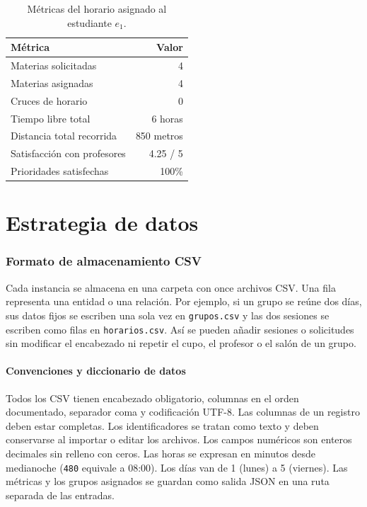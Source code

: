 \documentclass[11pt]{article}
\numberwithin{equation}{section}
\numberwithin{figure}{section}
\numberwithin{table}{section}
\theoremstyle{definition}
\begin{document}
\begin{table}[H]
\centering
\caption{Métricas del horario asignado al estudiante $e_1$.}
\begin{tabular}{lr}
\toprule
\textbf{Métrica} & \textbf{Valor} \\
\midrule
Materias solicitadas        & 4 \\
Materias asignadas          & 4 \\
Cruces de horario           & 0 \\
Tiempo libre total          & 6 horas \\
Distancia total recorrida   & 850 metros \\
Satisfacción con profesores & 4.25 / 5 \\
Prioridades satisfechas     & 100\% \\
\bottomrule
\end{tabular}
\end{table}

\part{Estrategia de datos}

\section{Formato de almacenamiento CSV}
\label{sec:csv}

Cada instancia se almacena en una carpeta con once archivos CSV. Una fila
representa una entidad o una relación. Por ejemplo, si un grupo se reúne
dos días, sus datos fijos se escriben una sola vez en \texttt{grupos.csv}
y las dos sesiones se escriben como filas en \texttt{horarios.csv}.
Así se pueden añadir sesiones o solicitudes sin modificar el encabezado
ni repetir el cupo, el profesor o el salón de un grupo.

\subsection{Convenciones y diccionario de datos}

Todos los CSV tienen encabezado obligatorio, columnas en el orden documentado,
separador coma y codificación UTF-8. Las columnas de un registro deben estar
completas. Los identificadores se tratan como texto y deben conservarse
al importar o editar los archivos. Los campos numéricos son enteros decimales
sin relleno con ceros. Las horas se expresan en minutos desde medianoche
(\texttt{480} equivale a 08:00). Los días van de 1 (lunes) a 5 (viernes).
Las métricas y los grupos asignados se guardan como salida JSON en una ruta
separada de las entradas.
\end{document}
